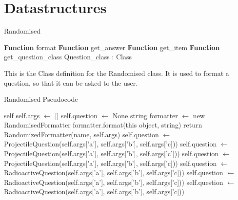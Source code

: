 \section{Datastructures}
	\algrenewcommand{}
	\begin{algorithm}[h]\label{randomised}
	\caption{Randomised}
	\begin{algorithmic}[1]
			\public
			\State \textbf{Function} format
			\State \textbf{Function} get\_answer
			\State \textbf{Function} get\_item
			\State \textbf{Function} get\_question\_class 
			\endpublic
			\private
			\State Question\_class : Class
			\endprivate
		\EndProcedure
	\end{algorithmic}
	\end{algorithm}
This is the Class definition for the Randomised class. It is used to format a question, so that it can be asked to the user.
\begin{algorithm}[h]\label{randomisedps}
	\caption{Randomised Pseudocode}
	\begin{algorithmic}[1]
		 {self}
			\State self.args $\gets$ []
			\State self.question $\gets$ None
		\EndFunction
		 {string}
			\State formatter $\gets$ new RandomisedFormatter
			\State formatter.format(this object, string)
		\EndFunction
			\State return RandomizedFormatter(name, self.args)
		\EndFunction
			\State self.question $\gets$ ProjectileQuestion(self.args['a'], self.args['b'], self.args['c]))
			\EndIf
			\State self.question $\gets$ ProjectileQuestion(self.args['a'], self.args['b'], self.args['c']))
			\EndIf
			\State self.question $\gets$ ProjectileQuestion(self.args['a'], self.args['b'], self.args['c]))
			\EndIf
			\State self.question $\gets$ RadioactiveQuestion(self.args['a'], self.args['b'], self.args['c]))
			\EndIf
			\State self.question $\gets$ RadioactiveQuestion(self.args['a'], self.args['b'], self.args['c]))
			\EndIf
			\State self.question $\gets$ RadioactiveQuestion(self.args['a'], self.args['b'], self.args['c]))
			\EndIf
		\EndFunction
		\EndProcedure
	\end{algorithmic}
\end{algorithm}
